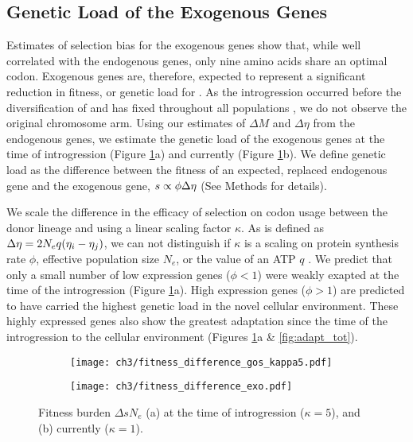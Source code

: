 \subsection{Genetic Load of the Exogenous Genes}

Estimates of selection bias for the exogenous genes show that, while well correlated with the endogenous genes, only nine amino acids share an optimal codon.
Exogenous genes are, therefore, expected to represent a significant reduction in fitness, or genetic load for \kluyveri.
As the introgression occurred before the diversification of \kluyveri and has fixed throughout all populations \citep{friedrich2015}, we do not observe the original chromosome arm.
Using our estimates of $\Delta M$ and $\Delta \eta$ from the endogenous genes, we estimate the genetic load of the exogenous genes at the time of introgression (Figure \ref{fig:sne_fitness_burden}a) and currently (Figure \ref{fig:sne_fitness_burden}b).
We define genetic load as the difference between the fitness of an expected, replaced endogenous gene and the exogenous gene, $s \propto \phi {\Delta \eta}$ (See Methods for details).

We scale the difference in the efficacy of selection on codon usage between the donor lineage and \kluyveri using a linear scaling factor $\kappa$.
As \DE is defined as ${\Delta \eta} = 2N_eq(\eta_i-\eta_j)$, we can not distinguish if $\kappa$ is a scaling on protein synthesis rate $\phi$, effective population size $N_e$, or the value of an ATP $q$ \citep{gilchrist2007, gilchrist2015}.
We predict that only a small number of low expression genes ($\phi < 1$) were weakly exapted at the time of the introgression (Figure \ref{fig:sne_fitness_burden}a).
High expression genes ($\phi > 1$) are predicted to have carried the highest genetic load in the novel cellular environment.
These highly expressed genes also show the greatest adaptation since the time of the introgression to the \kluyveri cellular environment (Figures \ref{fig:sne_fitness_burden}a \& \ref{fig:adapt_tot}).

\begin{figure}
    \centering
    \begin{subfigure}
        \centering
        \texttt{[image: ch3/fitness\_difference\_gos\_kappa5.pdf]}
    \end{subfigure}
    \begin{subfigure}
        \centering
        \texttt{[image: ch3/fitness\_difference\_exo.pdf]}
    \end{subfigure}
    \caption{Fitness burden $\Delta sN_e$ (a) at the time of introgression ($\kappa = 5$), and (b) currently ($\kappa = 1$). }
    \label{fig:sne_fitness_burden}
\end{figure}


